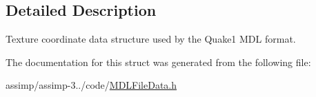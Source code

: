 \subsection{Detailed Description}
Texture coordinate data structure used by the Quake1 M\+D\+L format. 

The documentation for this struct was generated from the following file\+:\begin{DoxyCompactItemize}
\item 
assimp/assimp-\/3../code/\hyperlink{_m_d_l_file_data_8h}{M\+D\+L\+File\+Data.\+h}\end{DoxyCompactItemize}
